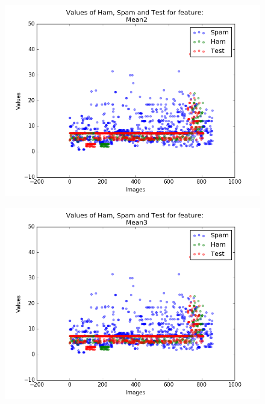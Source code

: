 \begin{figure}[h]
	\centering
	\begin{minipage}{.5\textwidth}
		\centering
		\includegraphics[width=\linewidth]{images/appA/Mean2_values_scatter}
		\label{fig:Mean2_values_scatter}
	\end{minipage}%
	\begin{minipage}{.5\textwidth}
		\centering
		\includegraphics[width=\linewidth]{images/appA/Mean3_values_scatter}
		\label{fig:Mean3_values_scatter}
	\end{minipage}
\end{figure}




